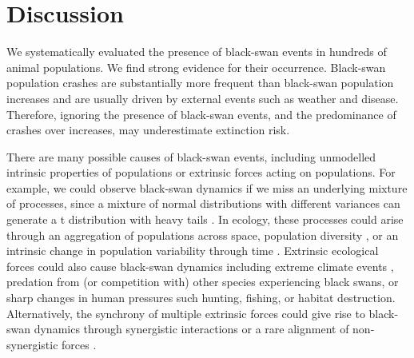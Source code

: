 \section{Discussion}

We systematically evaluated the presence of black-swan events in hundreds of
animal populations. We find strong evidence for their occurrence. Black-swan
population crashes are substantially more frequent than black-swan population
increases and are usually driven by external events such as weather and
disease. Therefore, ignoring the presence of black-swan events, and the
predominance of crashes over increases, may underestimate extinction risk.

There are many possible causes of black-swan events, including
unmodelled intrinsic properties of populations or extrinsic forces acting on
populations. For example, we could observe black-swan dynamics if we miss an
underlying mixture of processes, since a mixture of normal distributions with
different variances can generate a t distribution with heavy
tails \citep{gelman2014}. In ecology, these processes could arise through an
aggregation of populations across space, population
diversity \citep{schindler2010}, or an intrinsic change in population variability
through time \citep{carpenter2006}. Extrinsic ecological forces could also cause
black-swan dynamics \citep{nunez2012} including extreme climate
events \citep{meehl2004, katz2005, ipcc2012}, predation from (or competition
with) other species experiencing black swans, or sharp changes in human
pressures such hunting, fishing, or habitat destruction. Alternatively, the
synchrony of multiple extrinsic forces could give rise to black-swan dynamics
through synergistic interactions \citep{kirby2009} or a rare alignment of
non-synergistic forces \citep{denny2009}.

